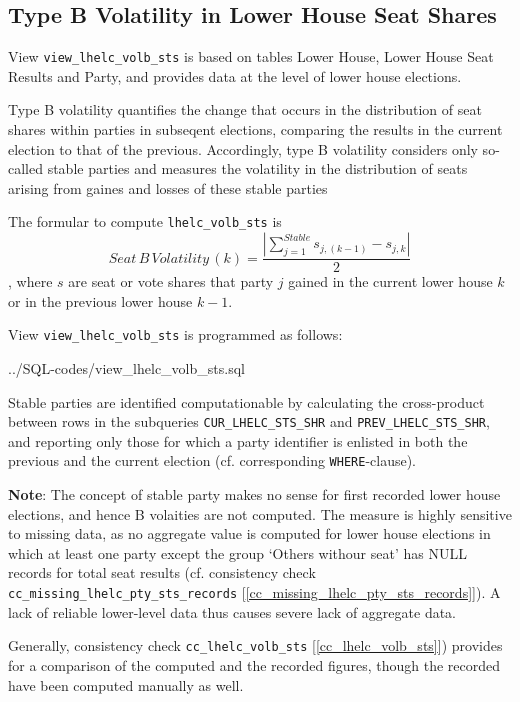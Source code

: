 \subsection{Type B Volatility in Lower House Seat Shares}\label{view_lhelc_volb_sts}
View \texttt{\footnotesize view\_lhelc\_volb\_sts} is based on tables Lower House, Lower House Seat Results and Party, and provides data at the level of lower house elections.

Type B volatility quantifies the change that occurs in the distribution of seat shares within parties in subseqent elections, comparing the results in the current election to that of the previous. 
Accordingly, type B volatility considers only so-called stable parties and measures the  volatility in the distribution of seats arising from gaines and losses of these stable parties	

The formular to compute \texttt{\footnotesize lhelc\_volb\_sts} is
\begin{equation}
Seat\,B\,Volatility\,(k) = \frac{ | \sum\limits_{j=1}^{Stable} s_{j,(k-1)} - s_{j,k}| }{2}
\end{equation}, where $s$ are seat or vote shares that party $j$ gained in the current lower house $k$ or in the previous lower house $k-1$.


View \texttt{\footnotesize view\_lhelc\_volb\_sts} is programmed as follows:

%
{../SQL-codes/view_lhelc_volb_sts.sql}

Stable parties are identified computationable by calculating the cross-product between rows in the subqueries 
\texttt{\footnotesize CUR\_LHELC\_STS\_SHR} and \texttt{\footnotesize PREV\_LHELC\_STS\_SHR}, and reporting only those for which a party identifier is enlisted in both the previous and the current election (cf. corresponding \texttt{\footnotesize WHERE}-clause). 

{\bf Note}: The concept of stable party makes no sense for first recorded lower house elections, and hence B volaities are not computed. 
The measure is highly sensitive to missing data, as no aggregate value is computed for lower house  elections in which at least one party except the group `Others withour seat' has NULL records for total seat results (cf. consistency check \texttt{\footnotesize cc\_missing\_lhelc\_pty\_sts\_records} [\ref{cc_missing_lhelc_pty_sts_records}]). A lack of reliable lower-level data thus causes severe lack of aggregate data. 

Generally, consistency check \texttt{\footnotesize cc\_lhelc\_volb\_sts} [\ref{cc_lhelc_volb_sts}]) provides for a comparison of the computed and the recorded figures, though the recorded have been computed manually as well.

